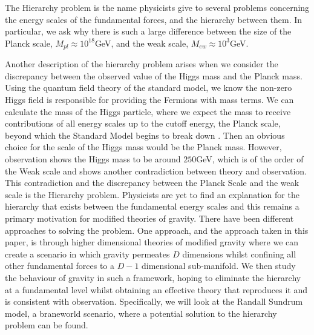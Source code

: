 \documentclass[11pt]{report}
\numberwithin{equation}{chapter}
\begin{document}
The Hierarchy problem is the name physicists give to several problems concerning the energy scales of the fundamental forces, and the hierarchy between them. In particular, we ask why there is such a large difference between the size of the Planck scale, $M_{pl} \approx 10^{18}$GeV, and the weak scale, $M_{ew} \approx 10^3$GeV\cite{hierarchyreview}.

Another description of the hierarchy problem arises when we consider the discrepancy between the observed value of the Higgs mass and the Planck mass. Using the quantum field theory of the standard model, we know the non-zero Higgs field is responsible for providing the Fermions with mass terms. We can calculate the mass of the Higgs particle, where we expect the mass to receive contributions of all energy scales up to the cutoff energy, the Planck scale, beyond which the Standard Model begins to break down \cite{Figures}. Then an obvious choice for the scale of the Higgs mass would be the Planck mass. However, observation shows the Higgs mass to be around $250$GeV\cite{hierarchyreview}, which is of the order of the Weak scale and shows another contradiction between theory and observation. This contradiction and the discrepancy between the Planck Scale and the weak scale is the Hierarchy problem. Physicists are yet to find an explanation for the hierarchy that exists between the fundamental energy scales and this remains a primary motivation for modified theories of gravity. There have been different approaches to solving the problem. One approach, and the approach taken in this paper, is through higher dimensional theories of modified gravity where we can create a scenario in which gravity permeates $D$ dimensions whilst confining all other fundamental forces to a $D-1$ dimensional sub-manifold. We then study the behaviour of gravity in such a framework, hoping to eliminate the hierarchy at a fundamental level whilst obtaining an effective theory that reproduces it and is consistent with observation. Specifically, we will look at the Randall Sundrum model, a braneworld scenario, where a potential solution to the hierarchy problem can be found. 
 
\end{document}
